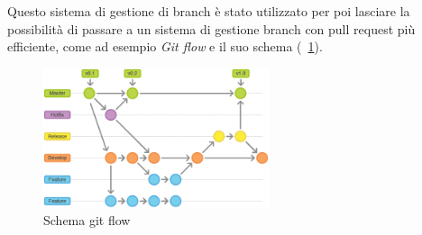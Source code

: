 \documentclass[a4paper,titlepage]{book}
\begin{document}
Questo sistema di gestione di branch \`{e} stato utilizzato per poi lasciare la possibilità di passare a un sistema di gestione branch con pull request pi\`{u} efficiente, come ad esempio \textit{Git flow} e il suo schema (\figurename~\ref{fig:git_flow}).

\begin{figure}
\center
\includegraphics[width=250px]{imgs/git_flow.png}
\caption{Schema git flow \label{fig:git_flow}}
\end{figure} 
\end{document}

